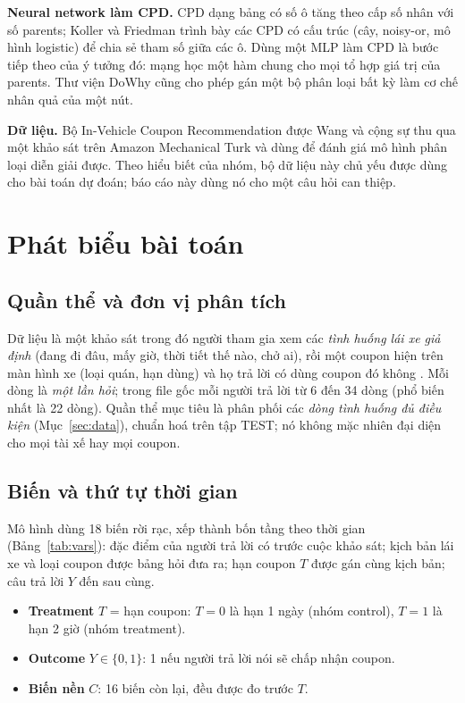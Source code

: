 \documentclass[pdflatex,sn-mathphys-num]{sn-jnl}%
\begin{document}
\textbf{Neural network làm CPD.} CPD dạng bảng có số ô tăng theo cấp số nhân với số parents; Koller và Friedman \cite{koller2009} trình bày các CPD có cấu trúc (cây, noisy-or, mô hình logistic) để chia sẻ tham số giữa các ô. Dùng một MLP làm CPD là bước tiếp theo của ý tưởng đó: mạng học một hàm chung cho mọi tổ hợp giá trị của parents. Thư viện DoWhy \cite{dowhy2020} cũng cho phép gán một bộ phân loại bất kỳ làm cơ chế nhân quả của một nút.

\textbf{Dữ liệu.} Bộ In-Vehicle Coupon Recommendation được Wang và cộng sự \cite{wang2017} thu qua một khảo sát trên Amazon Mechanical Turk và dùng để đánh giá mô hình phân loại diễn giải được. Theo hiểu biết của nhóm, bộ dữ liệu này chủ yếu được dùng cho bài toán dự đoán; báo cáo này dùng nó cho một câu hỏi can thiệp.

\section{Phát biểu bài toán}\label{sec:problem}

\subsection{Quần thể và đơn vị phân tích}

Dữ liệu là một khảo sát trong đó người tham gia xem các \emph{tình huống lái xe giả định} (đang đi đâu, mấy giờ, thời tiết thế nào, chở ai), rồi một coupon hiện trên màn hình xe (loại quán, hạn dùng) và họ trả lời có dùng coupon đó không \cite{wang2017}. Mỗi dòng là \emph{một lần hỏi}; trong file gốc mỗi người trả lời từ 6 đến 34 dòng (phổ biến nhất là 22 dòng). Quần thể mục tiêu là phân phối các \emph{dòng tình huống đủ điều kiện} (Mục~\ref{sec:data}), chuẩn hoá trên tập TEST; nó không mặc nhiên đại diện cho mọi tài xế hay mọi coupon.

\subsection{Biến và thứ tự thời gian}

Mô hình dùng 18 biến rời rạc, xếp thành bốn tầng theo thời gian (Bảng~\ref{tab:vars}): đặc điểm của người trả lời có trước cuộc khảo sát; kịch bản lái xe và loại coupon được bảng hỏi đưa ra; hạn coupon $T$ được gán cùng kịch bản; câu trả lời $Y$ đến sau cùng.

\begin{itemize}
\item \textbf{Treatment} $T$ = hạn coupon: $T=0$ là hạn 1 ngày (nhóm control), $T=1$ là hạn 2 giờ (nhóm treatment).
\item \textbf{Outcome} $Y \in \{0,1\}$: 1 nếu người trả lời nói sẽ chấp nhận coupon.
\item \textbf{Biến nền} $C$: 16 biến còn lại, đều được đo trước $T$.
\end{itemize}
\end{document}
